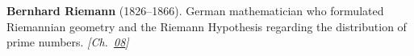 \textbf{Bernhard Riemann} (1826–1866). German mathematician who formulated Riemannian geometry and the Riemann Hypothesis regarding the distribution of prime numbers. \emph{[Ch.~\hyperref[ch:boundedprimegaps]{08}]}


